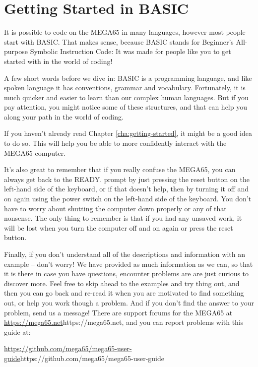 \chapter{Getting Started in BASIC}
\label{cha:basic-getting-started}

It is possible to code on the MEGA65 in many languages,
however most people start with BASIC.  That makes sense,
because BASIC stands for Beginner's All-purpose Symbolic
Instruction Code: It was made for people like you to get
started with in the world of coding!

A few short words before we dive in: BASIC is a programming
language, and like spoken language it has conventions, grammar
and vocabulary.  Fortunately, it is much quicker and easier
to learn than our complex human languages. But if you pay
attention, you might notice some of these structures, and that
can help you along your path in the world of coding.

If you haven't already read Chapter \ref{cha:getting-started},
it might be a good idea to do so. This will help you be able to
more confidently interact with the MEGA65 computer.

It's also great to remember that if you really confuse the MEGA65,
you can always get back to the READY. prompt by just pressing the
reset button on the left-hand side of the keyboard, or if that
doesn't help, then by turning it off
and on again using the power switch on the left-hand side of the keyboard.
You don't have to worry about shutting the computer
down properly or any of that nonsense.  The only thing to remember
is that if you had any unsaved work, it will be lost when you turn
the computer off and on again or press the reset button.

Finally, if you don't understand all of the descriptions and information
with an example -- don't worry! We have provided as much information
as we can, so that it is there in case you have questions, encounter problems are are
just curious to discover more.  Feel free to skip ahead to the examples
and try thing out, and then you can go back and re-read it when you are motivated
to find something out, or help you work though a problem.  And if you don't find
the answer to your problem, send us a message!  There are support forums for the
MEGA65 at \url{https://mega65.net}{https://mega65.net}, and you can
report problems with this guide at:

\url{https://github.com/mega65/mega65-user-guide}{https://github.com/mega65/mega65-user-guide}

